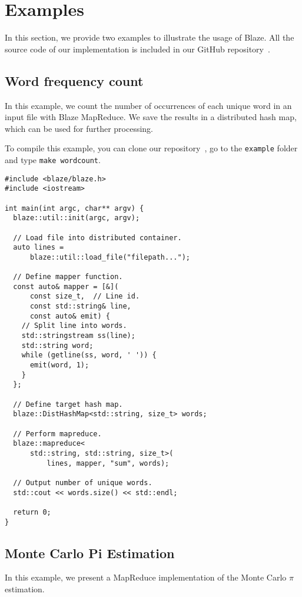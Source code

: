 \appendix
\section{Examples}
In this section, we provide two examples to illustrate the usage of Blaze.
All the source code of our implementation is included in our GitHub repository~\cite{blaze}.

\subsection{Word frequency count}
\label{app:wordcount}
In this example, we count the number of occurrences of each unique word in an input file with Blaze MapReduce.
We save the results in a distributed hash map, which can be used for further processing.

To compile this example, you can clone our repository~\cite{blaze}, go to the \lstinline{example} folder and type \lstinline{make wordcount}.

\begin{lstlisting}
#include <blaze/blaze.h>
#include <iostream>

int main(int argc, char** argv) {
  blaze::util::init(argc, argv);
  
  // Load file into distributed container.
  auto lines =
      blaze::util::load_file("filepath...");

  // Define mapper function.
  const auto& mapper = [&](
      const size_t,  // Line id.
      const std::string& line,
      const auto& emit) {
    // Split line into words.
    std::stringstream ss(line);
    std::string word;
    while (getline(ss, word, ' ')) {
      emit(word, 1);
    }
  };

  // Define target hash map.
  blaze::DistHashMap<std::string, size_t> words;

  // Perform mapreduce.
  blaze::mapreduce<
      std::string, std::string, size_t>(
          lines, mapper, "sum", words);
    
  // Output number of unique words.
  std::cout << words.size() << std::endl;
  
  return 0;
}
\end{lstlisting}

\subsection{Monte Carlo Pi Estimation}
\label{app:pi}

In this example, we present a MapReduce implementation of the Monte Carlo $\pi$ estimation.


